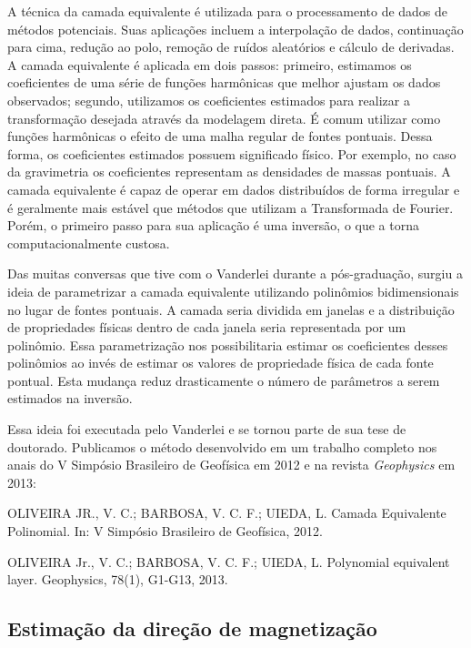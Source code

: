 \documentclass[12pt,a4paper,oneside,titlepage,onecolumn]{article}
\begin{document}
A técnica da camada equivalente é utilizada para o processamento de dados de
métodos potenciais.
Suas aplicações incluem a interpolação de dados, continuação para cima, redução
ao polo, remoção de ruídos aleatórios e cálculo de derivadas.
A camada equivalente é aplicada em dois passos:
primeiro, estimamos os coeficientes de uma série de funções harmônicas que
melhor ajustam os dados observados;
segundo, utilizamos os coeficientes estimados para realizar a transformação
desejada através da modelagem direta.
É comum utilizar como funções harmônicas o efeito de uma malha regular de
fontes pontuais.
Dessa forma, os coeficientes estimados possuem significado físico.
Por exemplo, no caso da gravimetria os coeficientes representam as densidades
de massas pontuais.
A camada equivalente é capaz de operar em dados distribuídos de forma irregular
e é geralmente mais estável que métodos que utilizam a Transformada de Fourier.
Porém, o primeiro passo para sua aplicação é uma inversão, o que a torna
computacionalmente custosa.

Das muitas conversas que tive com o Vanderlei durante a pós-graduação,
surgiu a ideia de parametrizar a camada equivalente utilizando polinômios
bidimensionais no lugar de fontes pontuais.
A camada seria dividida em janelas e a distribuição de propriedades físicas
dentro de cada janela seria representada por um polinômio.
Essa parametrização nos possibilitaria estimar os coeficientes desses
polinômios ao invés de estimar os valores de propriedade física de cada fonte
pontual.
Esta mudança reduz drasticamente o número de parâmetros a serem estimados na
inversão.

Essa ideia foi executada pelo Vanderlei e se tornou parte de sua tese de
doutorado.
Publicamos o método desenvolvido
em um trabalho completo nos anais do V Simpósio Brasileiro de Geofísica em 2012
e na revista \textit{Geophysics} em 2013:

\begin{displayquote}
    OLIVEIRA JR., V. C.; BARBOSA, V. C. F.; UIEDA, L.
    Camada Equivalente Polinomial. In: V Simpósio Brasileiro de Geofísica,
    2012.
\end{displayquote}

\begin{displayquote}
    OLIVEIRA Jr., V. C.; BARBOSA,  V. C. F.; UIEDA, L. Polynomial equivalent
    layer. Geophysics, 78(1), G1-G13, 2013.
\end{displayquote}



\subsection{Estimação da direção de magnetização}
\end{document}
